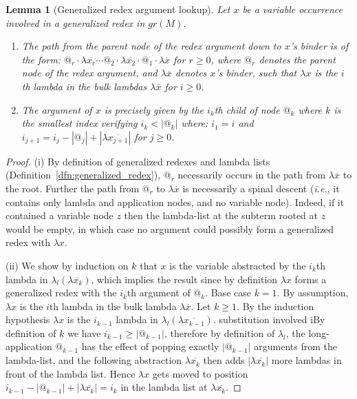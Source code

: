 \documentclass{elsarticle}
\makeatletter
\def\proofatend{\begin{proof}}
\def\endproofatend{\end{proof}}
\theoremstyle{plain}
\newtheorem{lemma}[theorem]{Lemma}
\theoremstyle{definition}
\theoremstyle{remark}
\newcommand\Nodes{\mathcal{N}}%
\newcommand\NodesApp{\Nodes_@}%
\renewcommand\ie{{\it i.e.\@\xspace}}
\makeatother
\begin{document}
\begin{lemma}[Generalized redex argument lookup]
\label{lemma:genredex_lookup}
Let $x$ be a variable occurrence involved in a generalized redex in $gr(M)$.
\begin{enumerate}[label=(\roman*), nosep]
    \item The path from the parent node of the redex argument down to $x$'s binder is of the form:
$ @_r \cdot \lambda\overline{x_r} \cdots
@_2 \cdot \lambda\overline{x_2} \cdot @_1 \cdot \lambda\overline{x}$
for $r\geq0$, where $@_r$ denotes the parent node of the redex argument, and $\lambda\overline{x}$ denotes $x$'s binder, such that $\lambda x$ is the $i$th lambda in the bulk lambdas $\lambda\overline{x}$ for $i\geq0$.

\item The argument of $x$ is precisely given by the $i_k$th child of node $@_k$ where $k$ is the smallest index verifying $i_k<|@_k|$ where: $i_1 = i$ and $i_{j+1} = i_j - |@_j| + |\lambda\overline{x_{j+1}}|$ for $j\geq 0$.
\end{enumerate}
\end{lemma}
\proofatend
(i) By definition of generalized redexes and lambda lists (Definition~\ref{dfn:generalized_redex}), $@_r$ necessarily occurs in the path from $\lambda\overline{x}$ to the root. Further the path from $@_r$ to $\lambda\overline{x}$ is necessarily a spinal descent (\ie, it contains only lambda and application nodes, and no variable node). Indeed, if it contained a variable node $z$ then the lambda-list at the subterm rooted at $z$ would be empty, in which case no argument could possibly form a generalized redex with $\lambda x$.

(ii) We show by induction on $k$ that $x$ is the variable abstracted by the $i_k$th lambda in $\lambda_l(\lambda\overline{x_k})$, which implies the result since by definition $\lambda x$ forms a generalized redex with the $i_k$th argument of $@_k$.
Base case $k=1$. By assumption, $\lambda x$ is the $i$th lambda in the bulk lambda $\lambda\overline{x}$. Let $k\geq 1$. By the induction hypothesis $\lambda x$ is the $i_{k-1}$ lambda in $\lambda_l(\lambda\overline{x_{k-1}})$.
substitution involved iBy definition of $k$ we have $i_{k-1}\geq|@_{k-1}|$, therefore by definition of $\lambda_l$, the long-application $@_{k-1}$ has the effect of popping exactly $|@_{k-1}|$ arguments from the lambda-list, and the following abstraction $\lambda\overline{x_k}$ then adds $|\lambda\overline{x_k}|$ more lambdas in front of the lambda list. Hence $\lambda x$ gets moved to position $i_{k-1} - |@_{k-1}| + |\lambda\overline{x_k}| = i_k$ in the lambda list at $\lambda\overline{x_k}$.
\endproofatend
\end{document}
